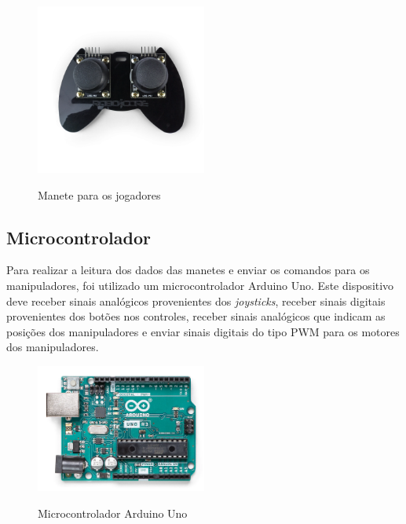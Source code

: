 \begin{figure}[H]
    \centering
    \caption{Manete para os jogadores}
    \includegraphics[keepaspectratio=true, width=0.5\textwidth]
    	{img/foto-controle-jogadores.png}
    \label{fig:fotoManeteJogadores}
\end{figure}

\subsection[Microcontrolador]{Microcontrolador}

Para realizar a leitura dos dados das manetes e enviar os comandos para os manipuladores, foi utilizado um microcontrolador Arduino Uno.
Este dispositivo deve receber sinais analógicos provenientes dos \textit{joysticks}, receber sinais digitais provenientes dos botões nos controles, receber sinais analógicos que indicam as posições dos manipuladores e enviar sinais digitais do tipo PWM para os motores dos manipuladores.

\begin{figure}[H]
    \centering
    \caption{Microcontrolador Arduino Uno}
    \includegraphics[keepaspectratio=true, width=0.5\textwidth]
    	{img/foto-arduino.png}
    \label{fig:fotoArduino}
\end{figure}

